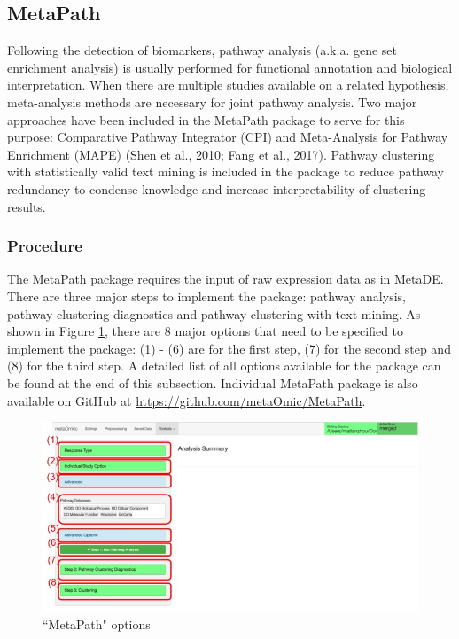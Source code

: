 \subsection{MetaPath}

Following the detection of biomarkers, pathway analysis (a.k.a. gene set enrichment analysis) is usually performed for functional annotation and biological interpretation. When there are multiple studies available on a related hypothesis, meta-analysis methods are necessary for joint pathway analysis. Two major approaches have been included in the MetaPath package to serve for this purpose: Comparative Pathway Integrator (CPI) and Meta-Analysis for Pathway Enrichment (MAPE) (Shen et al., 2010; Fang et al., 2017). Pathway clustering with statistically valid text mining is included in the package to reduce pathway redundancy to condense knowledge and increase interpretability of clustering results. 

\subsubsection{Procedure}
The MetaPath package requires the input of raw expression data as in MetaDE. There are three major steps to implement the package: pathway analysis, pathway clustering diagnostics and pathway clustering with text mining. As shown in Figure \ref{fig:MetaPathoption}, there are 8 major options that need to be specified to implement the package: (1) - (6) are for the first step, (7) for the second step and (8) for the third step. A detailed list of all options available for the package can be found at the end of this subsection. Individual MetaPath package is also available on GitHub at \url{https://github.com/metaOmic/MetaPath}.

\begin{figure}[H]
\begin{center}
\includegraphics[scale=0.45]{./figure/metaPath/metaPathoption.jpg}
\caption{``MetaPath" options}
\label{fig:MetaPathoption}
\end{center}
\end{figure}


